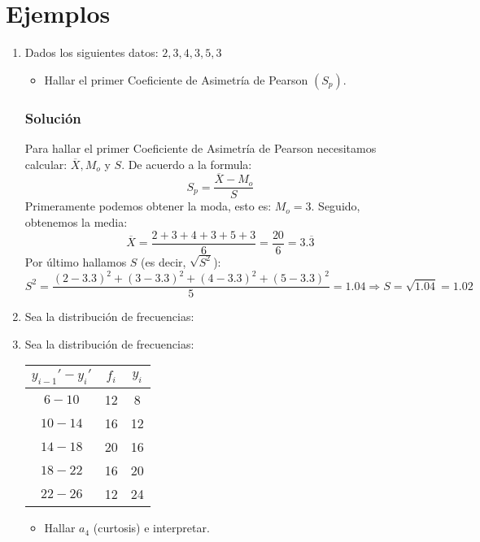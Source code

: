 \section{Ejemplos}
\begin{enumerate}
\item Dados los siguientes datos: $2,3,4,3,5,3$
\begin{itemize}
\item Hallar el primer Coeficiente de Asimetría de Pearson $(S_p)$.
\end{itemize}
\subsubsection{Solución}
Para hallar el primer Coeficiente de Asimetría de Pearson necesitamos calcular: $\overline{X}, M_o$ y $S$. De acuerdo a la formula:$$S_p = \dfrac{\overline{X}-M_o}{S}$$
Primeramente podemos obtener la moda, esto es: $M_o=3$. Seguido, obtenemos la media:
$$\overline{X}=\dfrac{2+3+4+3+5+3}{6}=\dfrac{20}{6}=3.\overline{3}$$
Por último hallamos $S$ (es decir, $\sqrt{S^2}$):
$$S^2=\dfrac{(2-3.3)^2+(3-3.3)^2+(4-3.3)^2+(5-3.3)^2}{5}=1.04 \Rightarrow S=\sqrt{1.04}=1.02$$
 
\item Sea la distribución de frecuencias:
\item Sea la distribución de frecuencias:
\begin{center}
\begin{tabular}{|c|c|c|}
\hline 
$y_{i-1}'-y_i'$ & $f_i$ & $y_i$ \\ 
\hline 
$6-10$ & 12 & 8 \\ 
\hline 
$10-14$ & 16 & 12 \\ 
\hline 
$14-18$ & 20 & 16 \\ 
\hline 
$18-22$ & 16 & 20 \\ 
\hline 
$22-26$ & 12 & 24 \\ 
\hline 
\end{tabular} 
\end{center}
\begin{itemize}
\item Hallar $a_4$ (curtosis) e interpretar.
\end{itemize}

\end{enumerate}
